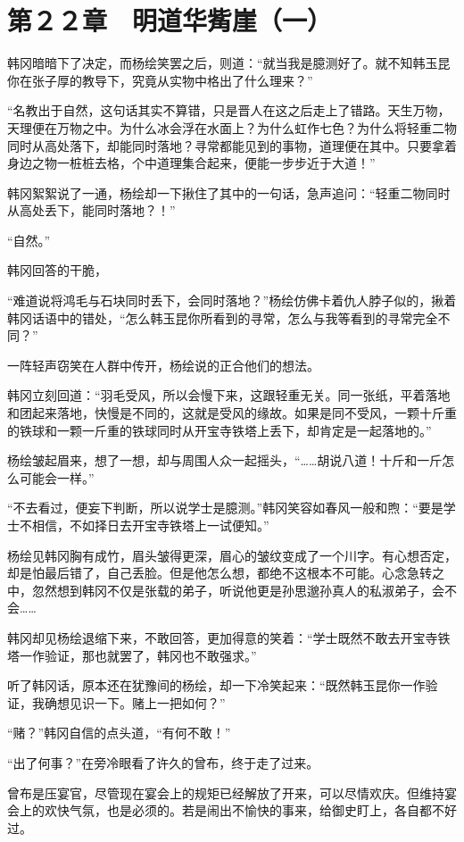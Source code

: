 \section{第２２章　明道华觜崖（一）}

韩冈暗暗下了决定，而杨绘笑罢之后，则道：“就当我是臆测好了。就不知韩玉昆你在张子厚的教导下，究竟从实物中格出了什么理来？”

“名教出于自然，这句话其实不算错，只是晋人在这之后走上了错路。天生万物，天理便在万物之中。为什么冰会浮在水面上？为什么虹作七色？为什么将轻重二物同时从高处落下，却能同时落地？寻常都能见到的事物，道理便在其中。只要拿着身边之物一桩桩去格，个中道理集合起来，便能一步步近于大道！”

韩冈絮絮说了一通，杨绘却一下揪住了其中的一句话，急声追问：“轻重二物同时从高处丢下，能同时落地？！”

“自然。”

韩冈回答的干脆，

“难道说将鸿毛与石块同时丢下，会同时落地？”杨绘仿佛卡着仇人脖子似的，揪着韩冈话语中的错处，“怎么韩玉昆你所看到的寻常，怎么与我等看到的寻常完全不同？”

一阵轻声窃笑在人群中传开，杨绘说的正合他们的想法。

韩冈立刻回道：“羽毛受风，所以会慢下来，这跟轻重无关。同一张纸，平着落地和团起来落地，快慢是不同的，这就是受风的缘故。如果是同不受风，一颗十斤重的铁球和一颗一斤重的铁球同时从开宝寺铁塔上丢下，却肯定是一起落地的。”

杨绘皱起眉来，想了一想，却与周围人众一起摇头，“……胡说八道！十斤和一斤怎么可能会一样。”

“不去看过，便妄下判断，所以说学士是臆测。”韩冈笑容如春风一般和煦：“要是学士不相信，不如择日去开宝寺铁塔上一试便知。”

杨绘见韩冈胸有成竹，眉头皱得更深，眉心的皱纹变成了一个川字。有心想否定，却是怕最后错了，自己丢脸。但是他怎么想，都绝不这根本不可能。心念急转之中，忽然想到韩冈不仅是张载的弟子，听说他更是孙思邈孙真人的私淑弟子，会不会……

韩冈却见杨绘退缩下来，不敢回答，更加得意的笑着：“学士既然不敢去开宝寺铁塔一作验证，那也就罢了，韩冈也不敢强求。”

听了韩冈话，原本还在犹豫间的杨绘，却一下冷笑起来：“既然韩玉昆你一作验证，我确想见识一下。赌上一把如何？”

“赌？”韩冈自信的点头道，“有何不敢！”

“出了何事？”在旁冷眼看了许久的曾布，终于走了过来。

曾布是压宴官，尽管现在宴会上的规矩已经解放了开来，可以尽情欢庆。但维持宴会上的欢快气氛，也是必须的。若是闹出不愉快的事来，给御史盯上，各自都不好过。

